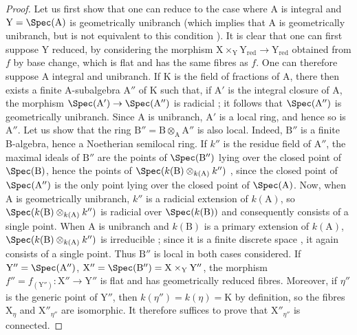 \begin{proof}
Let us first show that one can reduce to the case where A is integral and $\mathrm{Y}=\Spec(\mathrm{A})$ is geometrically unibranch  (which implies that A is geometrically unibranch, but is not equivalent to this condition ).
It is clear that one can first suppose Y reduced, by considering the morphism $\mathrm{X}\times_{\mathrm{Y}}\mathrm{Y}_{\mathrm{red}}\to\mathrm{Y}_{\mathrm{red}}$ obtained from $f$ by base change, which is flat and has the same fibres as $f$.
One can therefore suppose A integral and unibranch.
If K is the field of fractions of A, there then exists a finite A-subalgebra $\mathrm{A}''$ of K such that, if $\mathrm{A}'$ is the integral closure of A, the morphism $\Spec(\mathrm{A}')\to\Spec(\mathrm{A}'')$ is radicial ; it follows  that $\Spec(\mathrm{A}'')$ is geometrically unibranch.
Since A is unibranch, $\mathrm{A}'$ is a local ring, and hence so is $\mathrm{A}''$.
Let us show that the ring $\mathrm{B}''=\mathrm{B}\otimes_{\mathrm{A}}\mathrm{A}''$ is also local.
Indeed, $\mathrm{B}''$ is a finite B-algebra, hence a Noetherian semilocal ring.
If $k''$ is the residue field of $\mathrm{A}''$, the maximal ideals of $\mathrm{B}''$ are the points of $\Spec(\mathrm{B}'')$ lying over the closed point of $\Spec(\mathrm{B})$, hence the points of $\Spec(k(\mathrm{B})\otimes_{k(\mathrm{A})}k'')$ , since the closed point of $\Spec(\mathrm{A}'')$ is the only point lying over the closed point of $\Spec(\mathrm{A})$.
Now, when A is geometrically unibranch, $k''$ is a radicial extension of $k(\mathrm{A})$, so $\Spec(k(\mathrm{B})\otimes_{k(\mathrm{A})}k'')$ is radicial over $\Spec(k(\mathrm{B}))$ and consequently consists of a single point.
When A is unibranch and $k(\mathrm{B})$ is a primary extension of $k(\mathrm{A})$, $\Spec(k(\mathrm{B})\otimes_{k(\mathrm{A})}k'')$ is irreducible ; since it is a finite discrete space , it again consists of a single point.
Thus $\mathrm{B}''$ is local in both cases considered.
If $\mathrm{Y}''=\Spec(\mathrm{A}'')$, $\mathrm{X}''=\Spec(\mathrm{B}'')=\mathrm{X}\times_{\mathrm{Y}}\mathrm{Y}''$, the morphism $f''=f_{(\mathrm{Y}'')}:\mathrm{X}''\to\mathrm{Y}''$ is flat and has geometrically reduced fibres.
Moreover, if $\eta''$ is the generic point of $\mathrm{Y}''$, then $k(\eta'')=k(\eta)=\mathrm{K}$ by definition, so the fibres $\mathrm{X}_\eta$ and $\mathrm{X}''_{\eta''}$ are isomorphic.
It therefore suffices to prove that $\mathrm{X}''_{\eta''}$ is connected.
\end{proof}

